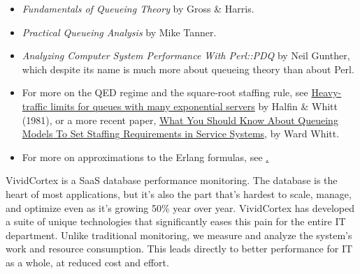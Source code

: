 \documentclass{vivid_layout_pdf}
\begin{document}
\begin{itemize}
\item {\itshape Fundamentals of Queueing Theory} by Gross \& Harris.
\item {\itshape Practical Queueing Analysis} by Mike Tanner.
\item {\itshape Analyzing Computer System Performance With Perl::PDQ} by Neil
Gunther, which despite its name is much more about queueing theory than about
Perl.
\item For more on the QED regime and the square-root staffing rule, see
\href{http://www.columbia.edu/~ww2040/HalfinWW1981.pdf}{Heavy-traffic limits for queues with many exponential servers} by Halfin \& Whitt (1981), or a more recent paper, \href{http://www.columbia.edu/~ww2040/shorter041907.pdf}{What You Should Know About Queueing Models To Set Staffing Requirements in Service Systems}, by Ward Whitt.
\item For more on approximations to the Erlang formulas, see
\href{https://github.com/VividCortex/approx-queueing-theory}.
\end{itemize}

\newpage

\begin{about}	%
VividCortex is a SaaS database performance monitoring. The database is the heart of most applications, but it's also the part that's hardest to scale, manage, and optimize even as it's growing 50\% year over year. VividCortex has developed a suite of unique technologies that significantly eases this pain for the entire IT department. Unlike traditional monitoring, we measure
and analyze the system's work and resource consumption. This leads directly to better performance for IT as a whole, at reduced cost and effort.
\end{about}
\makeresources	%
\end{document}
